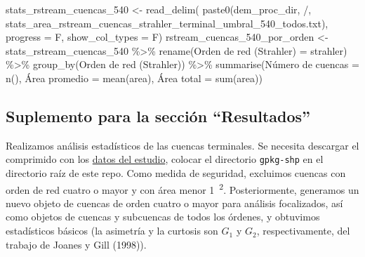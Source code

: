 \documentclass[spanish]{article}
\newenvironment{Shaded}{\begin{snugshade}}{\end{snugshade}}
\newcommand{\AttributeTok}[1]{\textcolor[rgb]{0.77,0.63,0.00}{#1}}
\newcommand{\FunctionTok}[1]{\textcolor[rgb]{0.00,0.00,0.00}{#1}}
\newcommand{\NormalTok}[1]{#1}
\newcommand{\OtherTok}[1]{\textcolor[rgb]{0.56,0.35,0.01}{#1}}
\newcommand{\SpecialCharTok}[1]{\textcolor[rgb]{0.00,0.00,0.00}{#1}}
\newcommand{\StringTok}[1]{\textcolor[rgb]{0.31,0.60,0.02}{#1}}
\begin{document}
\begin{Shaded}
\begin{Highlighting}[]
\NormalTok{stats\_rstream\_cuencas\_540 }\OtherTok{\textless{}{-}} \FunctionTok{read\_delim}\NormalTok{(}
  \FunctionTok{paste0}\NormalTok{(dem\_proc\_dir, }\StringTok{\textquotesingle{}/\textquotesingle{}}\NormalTok{,}
         \StringTok{\textquotesingle{}stats\_area\_rstream\_cuencas\_strahler\_terminal\_umbral\_540\_todos.txt\textquotesingle{}}\NormalTok{),}
  \AttributeTok{progress =}\NormalTok{ F, }\AttributeTok{show\_col\_types =}\NormalTok{ F)}
\NormalTok{rstream\_cuencas\_540\_por\_orden }\OtherTok{\textless{}{-}}\NormalTok{ stats\_rstream\_cuencas\_540 }\SpecialCharTok{\%\textgreater{}\%} 
  \FunctionTok{rename}\NormalTok{(}\StringTok{\textasciigrave{}}\AttributeTok{Orden de red (Strahler)}\StringTok{\textasciigrave{}} \OtherTok{=}\NormalTok{ strahler) }\SpecialCharTok{\%\textgreater{}\%} 
  \FunctionTok{group\_by}\NormalTok{(}\StringTok{\textasciigrave{}}\AttributeTok{Orden de red (Strahler)}\StringTok{\textasciigrave{}}\NormalTok{)  }\SpecialCharTok{\%\textgreater{}\%}
  \FunctionTok{summarise}\NormalTok{(}\StringTok{\textasciigrave{}}\AttributeTok{Número de cuencas}\StringTok{\textasciigrave{}} \OtherTok{=} \FunctionTok{n}\NormalTok{(),}
            \StringTok{\textasciigrave{}}\AttributeTok{Área promedio}\StringTok{\textasciigrave{}} \OtherTok{=} \FunctionTok{mean}\NormalTok{(area),}
            \StringTok{\textasciigrave{}}\AttributeTok{Área total}\StringTok{\textasciigrave{}} \OtherTok{=} \FunctionTok{sum}\NormalTok{(area))}
\end{Highlighting}
\end{Shaded}

\hypertarget{suplemento-para-la-secciuxf3n-resultados}{%
\subsection{Suplemento para la sección
``Resultados''}\label{suplemento-para-la-secciuxf3n-resultados}}

Realizamos análisis estadísticos de las cuencas terminales. Se necesita
descargar el comprimido con los
\href{https://doi.org/10.5281/zenodo.8146391}{datos del estudio},
colocar el directorio \texttt{gpkg-shp} en el directorio raíz de este
repo. Como medida de seguridad, excluimos cuencas con orden de red
cuatro o mayor y con área menor 1~\textsuperscript{2}. Posteriormente,
generamos un nuevo objeto de cuencas de orden cuatro o mayor para
análisis focalizados, así como objetos de cuencas y subcuencas de todos
los órdenes, y obtuvimos estadísticos básicos (la asimetría y la
curtosis son \(G_1\) y \(G_2\), respectivamente, del trabajo de Joanes y
Gill (1998)).
\end{document}

